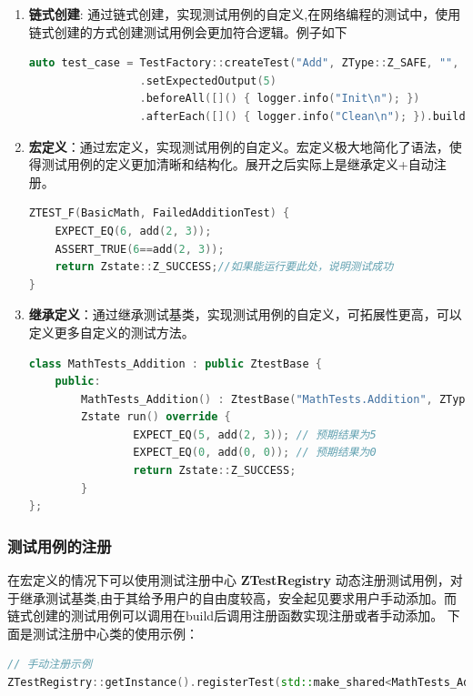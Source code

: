\documentclass[chinese]{article}
\begin{document}
\begin{enumerate}
    \item \textbf{链式创建}: 通过链式创建，实现测试用例的自定义,在网络编程的测试中，使用链式创建的方式创建测试用例会更加符合逻辑。例子如下
          \begin{lstlisting}[language=C++]
auto test_case = TestFactory::createTest("Add", ZType::Z_SAFE, "", add, 2, 3)
                 .setExpectedOutput(5)
                 .beforeAll([]() { logger.info("Init\n"); })          
                 .afterEach([]() { logger.info("Clean\n"); }).build();
                \end{lstlisting}
    \item \textbf{宏定义}：通过宏定义，实现测试用例的自定义。宏定义极大地简化了语法，使得测试用例的定义更加清晰和结构化。展开之后实际上是继承定义+自动注册。
          \begin{lstlisting}[language=C++]
ZTEST_F(BasicMath, FailedAdditionTest) {
    EXPECT_EQ(6, add(2, 3));
    ASSERT_TRUE(6==add(2, 3));
    return Zstate::Z_SUCCESS;//如果能运行要此处，说明测试成功
}
                \end{lstlisting}
    \item\textbf{继承定义}：通过继承测试基类，实现测试用例的自定义，可拓展性更高，可以定义更多自定义的测试方法。
          \begin{lstlisting}[language=C++]
class MathTests_Addition : public ZtestBase {
    public:
        MathTests_Addition() : ZtestBase("MathTests.Addition", ZType::ZSAFE, "Test addition function") {}
        Zstate run() override {
                EXPECT_EQ(5, add(2, 3)); // 预期结果为5
                EXPECT_EQ(0, add(0, 0)); // 预期结果为0
                return Zstate::Z_SUCCESS;
        }
};
\end{lstlisting}
\end{enumerate}
\subsubsection{测试用例的注册}在宏定义的情况下可以使用测试注册中心 \textbf{ZTestRegistry} 动态注册测试用例，对于继承测试基类,由于其给予用户的自由度较高，安全起见要求用户手动添加。而链式创建的测试用例可以调用在build后调用注册函数实现注册或者手动添加。
下面是测试注册中心类的使用示例：
\begin{lstlisting}[language=C++]
// 手动注册示例
ZTestRegistry::getInstance().registerTest(std::make_shared<MathTests_Addition>());

\end{lstlisting}
\newpage
\end{document}

